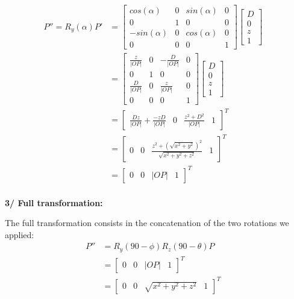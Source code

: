 \documentclass[a4paper,10pt]{article}
\begin{document}
\begin{equation}
\left.\begin{aligned}
P'' = R_y(\alpha)P'
&=
\begin{bmatrix}
	cos(\alpha)  & 0 & sin(\alpha) & 0 \\
	0 			 & 1 & 0		   & 0 \\
	-sin(\alpha) & 0 & cos(\alpha) & 0 \\
	0 			 & 0 & 0 		   & 1
\end{bmatrix}
\begin{bmatrix}
D \\ 0 \\ z \\ 1
\end{bmatrix}&\\
&=
\begin{bmatrix}
	\frac{z}{|OP|} & 0 & -\frac{D}{|OP|} & 0 \\
	0 			   & 1 & 0		   		 & 0 \\
	\frac{D}{|OP|} & 0 & \frac{z}{|OP|} & 0 \\
	0 			   & 0 & 0 		     & 1
\end{bmatrix}	
\begin{bmatrix}
D \\ 0 \\ z \\ 1
\end{bmatrix}&\\
&=
\begin{bmatrix}
\frac{Dz}{|OP|} + \frac{-zD}{|OP|} & 0 & \frac{z^2 + D^2}{|OP|} & 1
\end{bmatrix}^{T}&\\
&=
\begin{bmatrix}
0 & 0 & \frac{z^2 + (\sqrt{x^2 + y^2})^2}{\sqrt{x^2 + y^2 + z^2}} & 1
\end{bmatrix}^{T}&\\
&=
\begin{bmatrix}
0 & 0 & |OP| & 1
\end{bmatrix}^{T}&\\
\end{aligned}\right.
\end{equation}

\bigskip \bigskip \noindent
\textbf{3/ Full transformation:}

\bigskip \noindent
The full transformation consists in the concatenation of the two rotations we applied:
\begin{equation}
\left.\begin{aligned}
P'' &= R_y(90 - \phi)R_z(90 - \theta)P&\\
&=
\begin{bmatrix}
0 & 0 & |OP| & 1
\end{bmatrix}^{T}&\\
&=
\begin{bmatrix}
0 & 0 & \sqrt{x^2 + y^2 + z^2} & 1
\end{bmatrix}^{T}&\\
\end{aligned}\right.
\end{equation}
\end{document}
